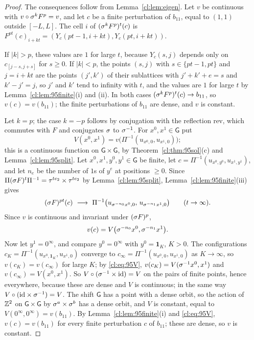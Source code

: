 \begin{proof}
The consequences follow from Lemma~\ref{cl:lem:eigen}. Let $v$ be continuous with $v\circ\sigma^kF^p=v$, and let $c$ be a finite perturbation of $b_{11}$, equal to $(1,1)$ outside $[-L,L]$. The cell $i$ of $(\sigma^kF^p)^t(c)$ is $F^{pt}(c)_{i+kt}=(Y_c(pt-1,i+kt),Y_c(pt,i+kt))$.

If $|k|>p$, these values are $1$ for large $t$, because $Y_c(s,j)$ depends only on $c_{[j-s,j+s]}$ for $s\ge0$. If $|k|<p$, the points $(s,j)$ with $s\in\{pt-1,pt\}$ and $j=i+kt$ are the points $(j',k')$ of their sublattices with $j'+k'+e=s$ and $k'-j'=j$, so $j'$ and $k'$ tend to infinity with $t$, and the values are $1$ for large $t$ by Lemma~\ref{cl:lem:95finite}(i) and (ii). In both cases $(\sigma^kF^p)^t(c)\to b_{11}$, so $v(c)=v(b_{11})$; the finite perturbations of $b_{11}$ are dense, and $v$ is constant.

Let $k=p$; the case $k=-p$ follows by conjugation with the reflection $\mathrm{rev}$, which commutes with $F$ and conjugates $\sigma$ to $\sigma^{-1}$. For $x^0,x^1\in\mathsf G$ put
\[
V(x^0,x^1)=v\bigl(\Pi^{-1}(u_{x^0,0},u_{x^1,0})\bigr);
\]
this is a continuous function on $\mathsf G\times\mathsf G$, by Theorem~\ref{cl:thm:95sol}(c) and Lemma~\ref{cl:lem:95split}. Let $x^0,x^1,y^0,y^1\in\mathsf G$ be finite, let $c=\Pi^{-1}(u_{x^0,y^0},u_{x^1,y^1})$, and let $n_e$ be the number of $1$s of $y^e$ at positions $\ge0$. Since $\Pi(\sigma F)^{t}\Pi^{-1}=\tau^{te_2}\times\tau^{te_2}$ by Lemma~\ref{cl:lem:95split}, Lemma~\ref{cl:lem:95finite}(iii) gives
\[
(\sh F)^{pt}(c)\ \longrightarrow\ \Pi^{-1}\bigl(u_{\sh^{-n_0}x^0,0},\,u_{\sh^{-n_1}x^1,0}\bigr)\qquad(t\to\infty).
\] Since $v$ is continuous and invariant under $(\sigma F)^p$,
\begin{equation}\label{cl:eq:95V}
v(c)=V\bigl(\sigma^{-n_0}x^0,\sigma^{-n_1}x^1\bigr).
\end{equation}
Now let $y^1=0^\infty$, and compare $y^0=0^\infty$ with $y^0=\mathbf 1_K$, $K>0$. The configurations $c_K=\Pi^{-1}(u_{x^0,\mathbf 1_K},u_{x^1,0})$ converge to $c_\infty=\Pi^{-1}(u_{x^0,0},u_{x^1,0})$ as $K\to\infty$, so $v(c_K)=v(c_\infty)$ for large $K$; by \eqref{cl:eq:95V}, $v(c_K)=V(\sigma^{-1}x^0,x^1)$ and $v(c_\infty)=V(x^0,x^1)$. So $V\circ(\sigma^{-1}\times\mathrm{id})=V$ on the pairs of finite points, hence everywhere, because these are dense and $V$ is continuous; in the same way $V\circ(\mathrm{id}\times\sigma^{-1})=V$. The shift $\mathsf G$ has a point with a dense orbit, so the action of $\mathbb{Z}^2$ on $\mathsf G\times\mathsf G$ by $\sigma^a\times\sigma^b$ has a dense orbit, and $V$ is constant, equal to $V(0^\infty,0^\infty)=v(b_{11})$. By Lemma~\ref{cl:lem:95finite}(i) and \eqref{cl:eq:95V}, $v(c)=v(b_{11})$ for every finite perturbation $c$ of $b_{11}$; these are dense, so $v$ is constant.
\end{proof}

